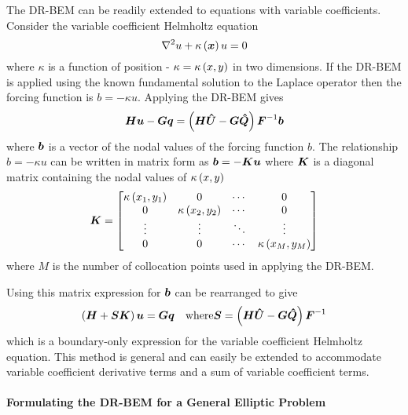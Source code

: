 The DR-BEM can be readily extended to equations with variable coefficients.
Consider the variable coefficient Helmholtz equation
\begin{equation}
  \laplacian{}{u} + \fnof{\kappa}{\vect{x}} u = 0
\end{equation}
where $\kappa$ is a function of position - $\kappa =  \kappa\left( x,y \right) $ in
two dimensions.  If the DR-BEM is applied using the known fundamental solution
to the Laplace operator then the forcing function is $b = -\kappa u$.
Applying the DR-BEM gives
\begin{equation}
  \matr{H} \vect{u} - \matr{G} \vect{q} = \pbrac{\matr{H} \matr{\hat{U}} -
    \matr{G} \matr{\hat{Q}}} \matr{F}^{-1} \vect{b}
  \label{eq:vcb}
\end{equation}
where $\vect{b}$ is a vector of the nodal values of the forcing function
$b$.  The relationship $b = -\kappa u$ can be written in matrix form as
$\vect{b} = - \matr{K} \vect{u}$ where $\matr{K}$ is a diagonal matrix
containing the nodal values of $ \kappa\left( x,y \right) $ \ie
\begin{equation}
  \matr{K} =  \begin{bmatrix} \fnof{\kappa}{x_{1},y_{1}} & 0 &
      \cdots & 0 \\ 0 & \fnof{\kappa}{x_{2},y_{2}} & \cdots & 0 \\ \vdots &
      \vdots & \ddots & \vdots \\ 0 & 0 & \cdots & \fnof{\kappa}{x_{M},y_{M}} 
\end{bmatrix}
\end{equation}
where $M$ is the number of collocation points used in applying the DR-BEM.

Using this matrix expression for $\vect{b}$  can be rearranged
to give
\begin{equation}
  \pbrac{\matr{H} + \matr{S} \matr{K}} \vect{u} = \matr{G}
  \vect{q}\quad\text{where}\matr{S} = \pbrac{\matr{H} \matr{\hat{U}} -
    \matr{G} \matr{\hat{Q}}} \matr{F}^{-1}
\end{equation}
which is a boundary-only expression for the variable coefficient Helmholtz
equation.  This method is general and can easily be extended to accommodate
variable coefficient derivative terms and a sum of variable coefficient
terms. 

\paragraph{Formulating the DR-BEM for a General Elliptic Problem}
\label{sec:genform}


